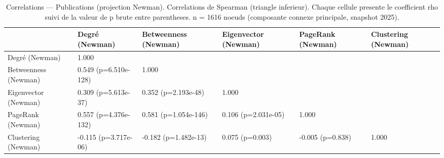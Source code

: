 \begin{table}
\caption{Correlations — Publications (projection Newman). Correlations de Spearman (triangle inferieur). Chaque cellule presente le coefficient rho suivi de la valeur de p brute entre parentheses. n = 1616 noeuds (composante connexe principale, snapshot 2025).}
\label{tab:corr_heatmap_corr_publications_newman}
\begin{tabular}{llllll}
\toprule
 & Degré (Newman) & Betweenness (Newman) & Eigenvector (Newman) & PageRank (Newman) & Clustering (Newman) \\
\midrule
Degré (Newman) & 1.000 &  &  &  &  \\
Betweenness (Newman) & 0.549
(p=6.510e-128) & 1.000 &  &  &  \\
Eigenvector (Newman) & 0.309
(p=5.613e-37) & 0.352
(p=2.193e-48) & 1.000 &  &  \\
PageRank (Newman) & 0.557
(p=4.376e-132) & 0.581
(p=1.054e-146) & 0.106
(p=2.031e-05) & 1.000 &  \\
Clustering (Newman) & -0.115
(p=3.717e-06) & -0.182
(p=1.482e-13) & 0.075
(p=0.003) & -0.005
(p=0.838) & 1.000 \\
\bottomrule
\end{tabular}
\end{table}
